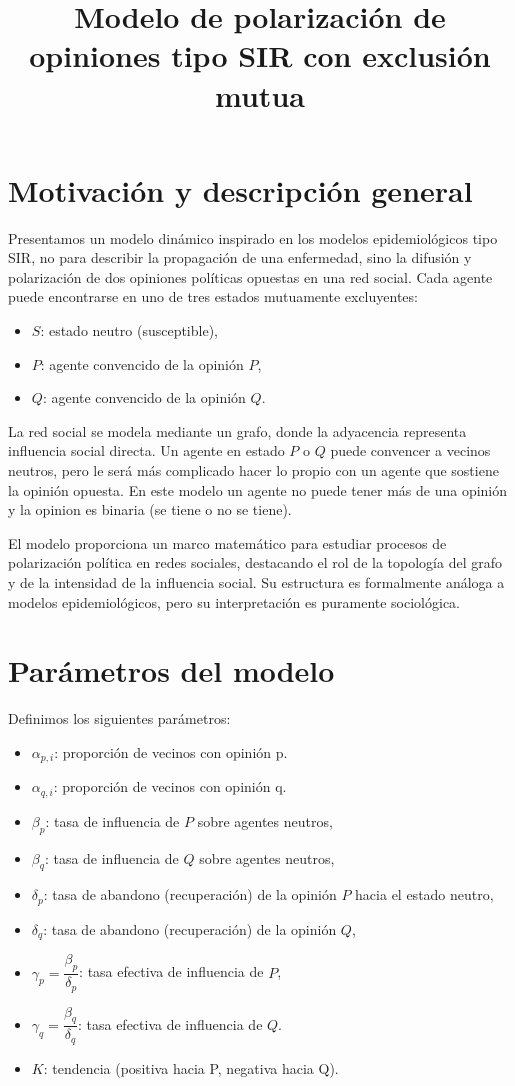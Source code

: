 \documentclass[11pt,a4paper]{article}
\title{Modelo de polarización de opiniones tipo SIR con exclusión mutua}
\author{}
\date{}
\begin{document}
\maketitle

\section{Motivación y descripción general}

Presentamos un modelo dinámico inspirado en los modelos epidemiológicos tipo SIR, no para describir la propagación de una enfermedad, sino la difusión y polarización de dos opiniones políticas opuestas en una red social. Cada agente puede encontrarse en uno de tres estados mutuamente excluyentes:
\begin{itemize}
    \item $S$: estado neutro (susceptible),
    \item $P$: agente convencido de la opinión $P$,
    \item $Q$: agente convencido de la opinión $Q$.
\end{itemize}

La red social se modela mediante un grafo, donde la adyacencia representa influencia social directa. Un agente en estado $P$ o $Q$ puede convencer a vecinos neutros, pero le será más complicado hacer lo propio con un agente que sostiene la opinión opuesta. En este modelo un agente no puede tener más de una opinión y la opinion es binaria (se tiene o no se tiene).

El modelo proporciona un marco matemático para estudiar procesos de polarización política en redes sociales, destacando el rol de la topología del grafo y de la intensidad de la influencia social. Su estructura es formalmente análoga a modelos epidemiológicos, pero su interpretación es puramente sociológica.

\section{Parámetros del modelo}

Definimos los siguientes parámetros:
\begin{itemize}
    \item $\alpha_{p,i}$: proporción de vecinos con opinión p.
    \item $\alpha_{q,i}$: proporción de vecinos con opinión q.
    \item $\beta_p$: tasa de influencia de $P$ sobre agentes neutros,
    \item $\beta_q$: tasa de influencia de $Q$ sobre agentes neutros,
    \item $\delta_p$: tasa de abandono (recuperación) de la opinión $P$ hacia el estado neutro,
    \item $\delta_q$: tasa de abandono (recuperación) de la opinión $Q$,
    \item $\gamma_p = \dfrac{\beta_p}{\delta_p}$: tasa efectiva de influencia de $P$,
    \item $\gamma_q = \dfrac{\beta_q}{\delta_q}$: tasa efectiva de influencia de $Q$.
    \item $K$: tendencia (positiva hacia P, negativa hacia Q).
\end{itemize}
\end{document}
